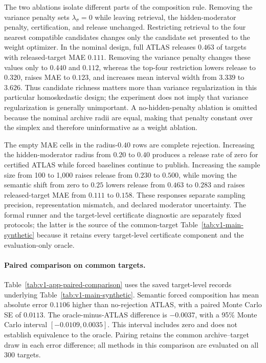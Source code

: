 \documentclass[11pt]{article}
\numberwithin{equation}{section}
\newcommand{\1}{\mathbf 1}
\begin{document}
The two ablations isolate different parts of the composition rule.  Removing the variance penalty sets $\lambda_\sigma=0$ while leaving retrieval, the hidden-moderator penalty, certification, and release unchanged.  Restricting retrieval to the four nearest compatible candidates changes only the candidate set presented to the weight optimizer.  In the nominal design, full ATLAS releases $0.463$ of targets with released-target MAE $0.111$.  Removing the variance penalty changes these values only to $0.440$ and $0.112$, whereas the top-four restriction lowers release to $0.320$, raises MAE to $0.123$, and increases mean interval width from $3.339$ to $3.626$.  Thus candidate richness matters more than variance regularization in this particular homoskedastic design; the experiment does not imply that variance regularization is generally unimportant.  A no-hidden-penalty ablation is omitted because the nominal archive radii are equal, making that penalty constant over the simplex and therefore uninformative as a weight ablation.

The empty MAE cells in the radius-$0.40$ rows are complete rejection.  Increasing the hidden-moderator radius from $0.20$ to $0.40$ produces a release rate of zero for certified ATLAS while forced baselines continue to publish.  Increasing the sample size from 100 to 1,000 raises release from $0.230$ to $0.500$, while moving the semantic shift from zero to $0.25$ lowers release from $0.463$ to $0.283$ and raises released-target MAE from $0.111$ to $0.158$.  These responses separate sampling precision, representation mismatch, and declared moderator uncertainty.  The formal runner and the target-level certificate diagnostic are separately fixed protocols; the latter is the source of the common-target Table~\ref{tab:v1-main-synthetic} because it retains every target-level certificate component and the evaluation-only oracle.


\paragraph{Paired comparison on common targets.}
Table~\ref{tab:v1-app-paired-comparison} uses the saved target-level records underlying Table~\ref{tab:v1-main-synthetic}.  Semantic forced composition has mean absolute error $0.1106$ higher than no-rejection ATLAS, with a paired Monte Carlo SE of $0.0113$.  The oracle-minus-ATLAS difference is $-0.0037$, with a 95\% Monte Carlo interval $[-0.0109,0.0035]$.  This interval includes zero and does not establish equivalence to the oracle.  Pairing retains the common archive--target draw in each error difference; all methods in this comparison are evaluated on all 300 targets.
\end{document}
